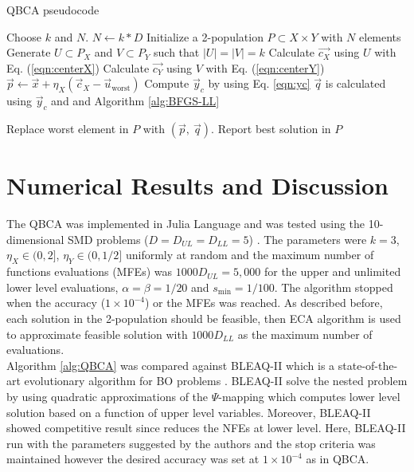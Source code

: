\documentclass[conference]{IEEEtran}
\theoremstyle{definition}
\begin{document}
\begin{algorithm}[!ht]
    \caption{QBCA pseudocode}
    \label{alg:QBCA}
    \begin{algorithmic}[1]
        \STATE Choose $k$ and $N$.
        \STATE $N \gets k * D$
        \STATE Initialize a 2-population $P\subset X\times Y$ with $N$ elements
                \STATE Generate $U \subset P_X$ and $V \subset P_Y$ such that $|U| = |V| = k$
                \STATE Calculate $\vec{c_X}$ using $U$ with Eq. (\ref{eqn:centerX})
                \STATE Calculate $\vec{c_Y}$ using $V$ with Eq. (\ref{eqn:centerY})
                \STATE $ \vec{p} \gets \vec{x} + \eta_{X} (\vec{c}_X - \vec{u}_{\text{worst}})$
                \STATE Compute $ \vec{y}_c $ by using Eq. \ref{eqn:yc}
                \STATE $ \vec{q} $ is calculated using $\vec{y}_c$ and and Algorithm \ref{alg:BFGS-LL}
                
                    \STATE Replace worst element in $P$ with $(\vec{p},\ \vec{q})$.
                \ENDIF
            \ENDFOR
        \ENDWHILE
        \STATE Report best solution in $P$
    \end{algorithmic}
\end{algorithm}

\section{Numerical Results and Discussion} %
\label{sec:numerical_result}

The QBCA was implemented in Julia Language \cite{bezanson2017julia} and was tested
using the 10-dimensional SMD problems ($D = D_{UL} = D_{LL} = 5$)
\cite{sinha2014test,sinha2013efficient}. The parameters were $k = 3$,
$\eta_{X} \in (0, 2]$, $\eta_{Y} \in (0, 1/2]$ uniformly at random and the maximum
number of functions evaluations (MFEs) was $1000D_{UL}=5,000$ for the upper and
unlimited lower level evaluations, $\alpha = \beta = 1 / 20$ and $s_{\min} = 1/100$.
The  algorithm stopped when the accuracy ($1\times 10^{-4}$) or the MFEs was reached.
As described before, each solution in the 2-population should be feasible, then
ECA algorithm \cite{eca} is used to approximate feasible solution with $1000D_{LL}$
as the maximum number of evaluations.\\

Algorithm \ref{alg:QBCA} was compared against BLEAQ-II which is a state-of-the-art
evolutionary algorithm for BO problems \cite{sinha2018review,sinha2013efficient}.
BLEAQ-II solve the nested problem by using quadratic approximations of the
$\Psi$-mapping which computes lower level solution based on a function of upper
level variables. Moreover, BLEAQ-II showed competitive result since reduces the
NFEs at lower level. Here, BLEAQ-II run with the parameters suggested by the
authors \cite{sinha2018review,sinha2017bilevel} and the stop criteria was maintained
however the desired accuracy was set at $1\times 10^{-4}$ as in QBCA.
\end{document}
